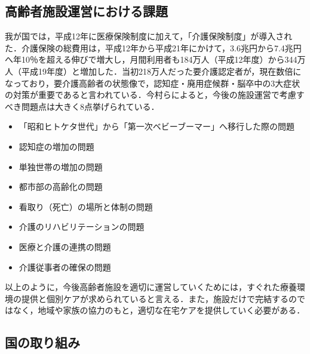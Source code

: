 \subsection{高齢者施設運営における課題}
我が国では，平成12年に医療保険制度に加えて，「介護保険制度」が導入された．介護保険の総費用は，平成12年から平成21年にかけて，3.6兆円から7.4兆円へ年10％を超える伸びで増大し，月間利用者も184万人（平成12年度）から344万人（平成19年度）と増加した．当初218万人だった要介護認定者が，現在数倍になっており，要介護高齢者の状態像で，認知症・廃用症候群・脳卒中の3大症状の対策が重要であると言われている．今村ら\cite{nursing_management}によると，今後の施設運営で考慮すべき問題点は大きく8点挙げられている．

\begin{itemize}
 \item 「昭和ヒトケタ世代」から「第一次ベビーブーマー」へ移行した際の問題
 \item 認知症の増加の問題
 \item 単独世帯の増加の問題
 \item 都市部の高齢化の問題
 \item 看取り（死亡）の場所と体制の問題
 \item 介護のリハビリテーションの問題
 \item 医療と介護の連携の問題
 \item 介護従事者の確保の問題
\end{itemize}

以上のように，今後高齢者施設を適切に運営していくためには，すぐれた療養環境の提供と個別ケアが求められていると言える．また，施設だけで完結するのではなく，地域や家族の協力のもと，適切な在宅ケアを提供していく必要がある．

\subsection{国の取り組み}


